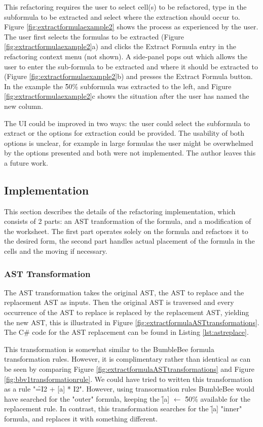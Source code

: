 This refactoring requires the user to select cell(s) to be refactored, type in the subformula to be extracted and select where the extraction should occur to.
Figure \ref{fig:extractformulaexample2} shows the process as experienced by the user.
The user first selects the formulas to be extracted (Figure \ref{fig:extractformulaexample2}a) and clicks the Extract Formula entry in the refactoring context menu (not shown).
A side-panel pops out which allows the user to enter the sub-formula to be extracted and where it should be extracted to (Figure \ref{fig:extractformulaexample2}b) and presses the Extract Formula button.
In the example the \f{50\%} subformula was extracted to the left, and Figure \ref{fig:extractformulaexample2}c shows the situation after the user has named the new column.

The UI could be improved in two ways: the user could select the subformula to extract or the options for extraction could be provided.
The usability of both options is unclear, for example in large formulas the user might be overwhelmed by the options presented and both were not implemented.
The author leaves this a future work.

\subsection{Implementation}

This section describes the details of the refactoring implementation, which consists of 2 parts: an AST tranformation of the formula, and a modification of the worksheet.
The first part operates solely on the formula and refactors it to the desired form, the second part handles actual placement of the formula in the cells and the moving if necessary.

\subsubsection{AST Transformation}
\label{subsec:astreplacementtransformation}

The AST transformation takes the original AST, the AST to replace and the replacement AST as inputs.
Then the original AST is traversed and every occurrence of the AST to replace is replaced by the replacement AST, yielding the new AST, this is illustrated in Figure \ref{fig:extractformulaASTtransformations}.
The C\# code for the AST replacement can be found in Listing \ref{lst:astreplace}.

This transformation is somewhat similar to the BumbleBee formula transformation rules.
However, it is complimentary rather than identical as can be seen by comparing Figure \ref{fig:extractformulaASTtransformations} and Figure \ref{fig:bbv1transformationrule}.
We could have tried to written this transformation as a rule "\f{=I2 + [a] * I2}".
However, using transormation rules BumbleBee would have searched for the "outer" formula, keeping the \f{[a]} $\gets$ \f{50\%} available for the replacement rule.
In contrast, this transformation searches for the \f{[a]} "inner" formula, and replaces it with something different.

